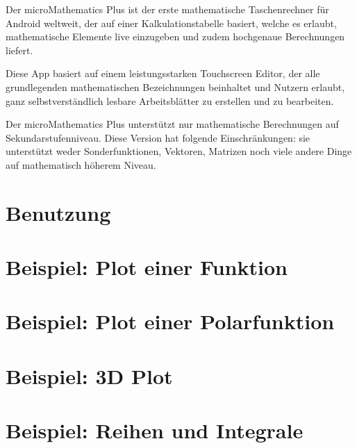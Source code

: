 \documentclass[DIV=calc, paper=a4, fontsize=11pt, twocolumn]{scrartcl}
\begin{document}
\maketitle
\thispagestyle{fancy} %

\begin{bf}
Der microMathematics Plus ist der erste mathematische
Taschenrechner für Android weltweit, der auf einer Kalkulationstabelle basiert,
welche es erlaubt, mathematische Elemente live einzugeben und zudem hochgenaue
Berechnungen liefert.

Diese App basiert auf einem leistungsstarken Touchscreen Editor, der alle
grundlegenden mathematischen Bezeichnungen beinhaltet und Nutzern erlaubt, ganz
selbstverständlich lesbare Arbeitsblätter zu erstellen und zu bearbeiten.

Der microMathematics Plus unterstützt nur mathematische Berechnungen auf
Sekundarstufenniveau. Diese Version hat folgende Einschränkungen: sie
unterstützt weder Sonderfunktionen, Vektoren, Matrizen noch viele andere Dinge
auf mathematisch höherem Niveau.
\end{bf}

\section{Benutzung}


\section{Beispiel: Plot einer Funktion}


\section{Beispiel: Plot einer Polarfunktion}


\section{Beispiel: 3D Plot}


\section{Beispiel: Reihen und Integrale}

\end{document}
